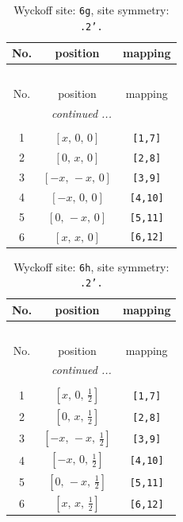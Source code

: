 \documentclass[fleqn,8pt]{jsarticle}
\begin{document}
\begin{longtable}{ccc}
\caption{Wyckoff site: {\tt 6g}, site symmetry: {\tt .2'.}}
 \\
 \hline \hline
No. & position & mapping \\ \hline \endfirsthead

\multicolumn{2}{l}{\tablename\ \thetable{}} \\
 \hline \hline
No. & position & mapping \\ \hline \endhead

 \hline \hline
\multicolumn{2}{r}{\footnotesize\it continued ...} \\ \endfoot

 \hline \hline
\multicolumn{2}{r}{} \\ \endlastfoot

1 & $\left[ x,\, 0,\, 0 \right]$ & {\tt [1,7]} \\ \hline
2 & $\left[ 0,\, x,\, 0 \right]$ & {\tt [2,8]} \\ \hline
3 & $\left[ - x,\, - x,\, 0 \right]$ & {\tt [3,9]} \\ \hline
4 & $\left[ - x,\, 0,\, 0 \right]$ & {\tt [4,10]} \\ \hline
5 & $\left[ 0,\, - x,\, 0 \right]$ & {\tt [5,11]} \\ \hline
6 & $\left[ x,\, x,\, 0 \right]$ & {\tt [6,12]} \\
\end{longtable}
\renewcommand{\arraystretch}{1.2}
\begin{longtable}{ccc}
\caption{Wyckoff site: {\tt 6h}, site symmetry: {\tt .2'.}}
 \\
 \hline \hline
No. & position & mapping \\ \hline \endfirsthead

\multicolumn{2}{l}{\tablename\ \thetable{}} \\
 \hline \hline
No. & position & mapping \\ \hline \endhead

 \hline \hline
\multicolumn{2}{r}{\footnotesize\it continued ...} \\ \endfoot

 \hline \hline
\multicolumn{2}{r}{} \\ \endlastfoot

1 & $\left[ x,\, 0,\, \frac{1}{2} \right]$ & {\tt [1,7]} \\ \hline
2 & $\left[ 0,\, x,\, \frac{1}{2} \right]$ & {\tt [2,8]} \\ \hline
3 & $\left[ - x,\, - x,\, \frac{1}{2} \right]$ & {\tt [3,9]} \\ \hline
4 & $\left[ - x,\, 0,\, \frac{1}{2} \right]$ & {\tt [4,10]} \\ \hline
5 & $\left[ 0,\, - x,\, \frac{1}{2} \right]$ & {\tt [5,11]} \\ \hline
6 & $\left[ x,\, x,\, \frac{1}{2} \right]$ & {\tt [6,12]} \\
\end{longtable}
\end{document}
